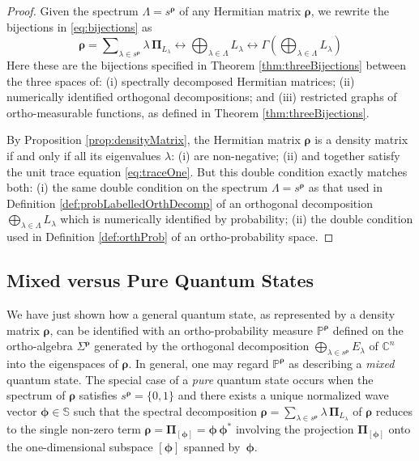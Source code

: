 \documentclass[11pt]{article}
\newcommand \C { \mathbb{C} }
\newcommand \Sph { \mathbb{S} }
\begin{document}
\begin{proof}
	Given the spectrum $ \Lambda = s^{ \boldsymbol \rho }$ 
	of any Hermitian matrix $ \boldsymbol \rho $, 
	we rewrite the bijections in \eqref{eq:bijections} as
\begin{equation} 
	\boldsymbol \rho = \sum\nolimits _{ \lambda \in s^{ \boldsymbol \rho }} 
	\lambda \, \boldsymbol \Pi _{ L_\lambda } 
	\longleftrightarrow 
	\bigoplus\nolimits _{ \lambda \in \Lambda } L_\lambda 
	\longleftrightarrow 
	\Gamma \left( \bigoplus\nolimits _{ \lambda \in \Lambda } L_\lambda \right)
\end{equation}
	Here these are the bijections specified in Theorem \ref{thm:threeBijections} 
	between the three spaces of:
	(i) spectrally decomposed Hermitian matrices; 
	(ii) numerically identified orthogonal decompositions;
	and (iii) restricted graphs of ortho-measurable functions, 
	as defined in Theorem \ref{thm:threeBijections}.
	
	By Proposition \ref{prop:densityMatrix}, the Hermitian matrix $ \boldsymbol \rho $
	is a density matrix if and only if all its eigenvalues $ \lambda $:
	(i) are non-negative;
	(ii) and together satisfy the unit trace equation \eqref{eq:traceOne}.
	But this double condition exactly matches both: 
	(i) the same double condition on the spectrum $ \Lambda = s^{ \boldsymbol \rho }$ 
	as that used in Definition \ref{def:probLabelledOrthDecomp} 
	of an orthogonal decomposition \( \bigoplus\nolimits _{ \lambda \in \Lambda } L_\lambda \) 
	which is numerically identified by probability;
	(ii) the double condition used in Definition \ref{def:orthProb} 
	of an ortho-probability space.
\end{proof}

\subsection{Mixed versus Pure Quantum States} \label{ss:pureStates}

We have just shown how a general quantum state, 
as represented by a density matrix $ \boldsymbol \rho $, 
can be identified with an ortho-probability measure $ \mathbb P^{ \boldsymbol \rho }$ 
defined on the ortho-algebra $ \Sigma ^{ \boldsymbol \rho }$ generated 
by the orthogonal decomposition $ \bigoplus _{ \lambda \in s^{ \boldsymbol \rho }} E_\lambda $
of $ \C^n$ into the eigenspaces of $ \boldsymbol \rho $.
In general, one may regard $ \mathbb P^{ \boldsymbol \rho }$
as describing a \emph{mixed} quantum state.
The special case of a \emph{pure} quantum state occurs 
when the spectrum of $ \boldsymbol \rho $ satisfies $ s^{ \boldsymbol \rho } = \{0, 1\} $
and there exists a unique normalized wave vector $ \boldsymbol \phi \in \Sph $
such that the spectral decomposition 
\( \boldsymbol \rho = \sum _{ \lambda \in s^{ \boldsymbol \rho }} 
	\lambda \, \boldsymbol \Pi _{ L_\lambda } \) of $ \boldsymbol \rho $ 
reduces to the single non-zero term
\( \boldsymbol \rho = \boldsymbol \Pi _{[ \boldsymbol \phi ]} 
 = \boldsymbol \phi \, \boldsymbol \phi ^* \)
involving the projection $ \boldsymbol \Pi _{[ \boldsymbol \phi ]}$
onto the one-dimensional subspace $[ \boldsymbol \phi ]$ spanned by~$ \boldsymbol \phi $.
\end{document}
